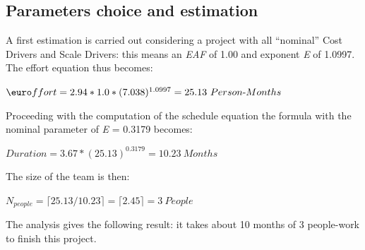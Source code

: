 \documentclass[a4paper,11pt]{report} %
\begin{document}
		\subsection{Parameters choice and estimation}
			A first estimation is carried out considering a project with all “nominal” Cost Drivers and Scale Drivers: this means an \textit{EAF} of 1.00 and exponent \textit{E} of 1.0997. The effort equation thus becomes: 
			\begin{center}\($\euro$ffort = 2.94 * 1.0 * (7.038)^{1.0997} = 25.13 \ Person$-$Months\)\end{center}
			Proceeding with the computation of the schedule equation the formula with the nominal parameter of \textit{E} = 0.3179 becomes:
			\begin{center}\(Duration = 3.67 * (25.13)^{0.3179} = 10.23 \ Months\)\end{center}
			The size of the team is then:
			\begin{center}\(N_{people} = \lceil 25.13 / 10.23 \rceil = \lceil 2.45 \rceil = 3 \ People\)\end{center}
			The analysis gives the following result: it takes about 10 months of 3 people-work to finish this project.
			\bigskip\\
\end{document}
